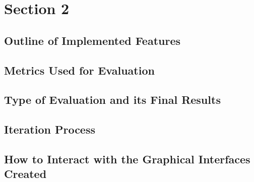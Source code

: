 \chapter{Section 2} \label{section2}
\section{Outline of Implemented Features}
\section{Metrics Used for Evaluation}
\section{Type of Evaluation and its Final Results}
\section{Iteration Process}
\section{How to Interact with the Graphical Interfaces Created}